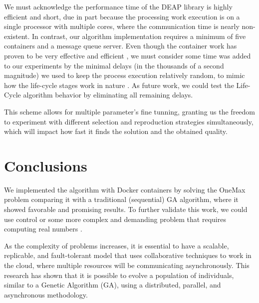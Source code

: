 \documentclass[runningheads]{llncs}
\begin{document}
We must acknowledge the performance time of the DEAP library
\cite{fortin2012deap} is highly efficient and short, due in part because the
processing work execution is on a single processor with multiple cores, where
the communication time is nearly non-existent. In contrast, our algorithm
implementation requires a minimum of five containers and a message queue
server. Even though the container work has proven to be very effective and
efficient \cite{merelo2016performance,valdez2021container}, we must consider
some time was added to our experiments by the minimal delays (in the thousands
of a second magnitude) we used to keep the process execution relatively random,
to mimic how the life-cycle stages work in nature \cite{read1968system}. As
future work, we could test the Life-Cycle algorithm behavior by eliminating all
remaining delays.

This scheme allows for multiple parameter's fine tunning, granting us the
freedom to experiment with different selection and reproduction strategies
simultaneously, which will impact how fast it finds the solution and the
obtained quality.

\section{Conclusions}

We implemented the algorithm with Docker containers by solving the OneMax
problem comparing it with a traditional (sequential) GA algorithm, where it
showed favorable and promising results. To further validate this work, we could
use control or some more complex and demanding problem that requires computing
real numbers \cite{stanley2002evolving,miikkulainen2019evolving}.

As the complexity of problems increases, it is essential to have a scalable,
replicable, and fault-tolerant model that uses collaborative techniques to work
in the cloud, where multiple resources will be communicating asynchronously.
This research has shown that it is possible to evolve a population of
individuals, similar to a Genetic Algorithm (GA), using a distributed,
parallel, and asynchronous methodology.


%
%
%



% 



%
%
%


%
\end{document}
